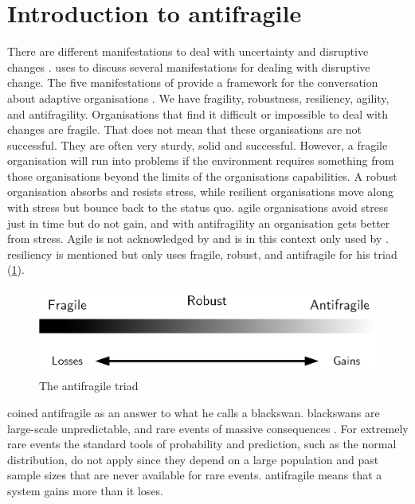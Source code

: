 \section{Introduction to antifragile}
\label{sec:introantifragility}
There are different manifestations to deal with uncertainty and disruptive changes \parencite[pp.~79--81]{Steen2018}. \Textcite{Steen2018} uses \textcite{Taleb2012} to discuss several manifestations for dealing with disruptive change. The five manifestations of \textcite{Taleb2012} provide a framework for the conversation about adaptive organisations \parencite[pp.~79--81]{Steen2018}. We have \gls{fragility}, \gls{robustness}, \gls{resiliency}, \gls{agility}, and \gls{antifragility}. Organisations that find it difficult or impossible to deal with changes are fragile. That does not mean that these organisations are not successful. They are often very sturdy, solid and successful. However, a fragile organisation will run into problems if the environment requires something from those organisations beyond the limits of the organisations capabilities. A \gls{robust} organisation absorbs and resists stress, while \gls{resilient} organisations move along with stress but bounce back to the status quo. \Gls{agile} organisations avoid stress just in time but do not gain, and with \gls{antifragility} an organisation gets better from stress. Agile is not acknowledged by \textcite{Taleb2012} and is in this context only used by \textcite{Steen2018}. \Gls{resiliency} is mentioned but \textcite{Taleb2012} only uses \gls{fragile}, \gls{robust}, and \gls{antifragile} for his \gls{triad} (\cref{fig:antifragilesimple}).
\begin{figure}[H]
	\centering
	\includegraphics[width=0.6\linewidth]{images/antifragilesimple}
	\caption[The antifragile triad]{The antifragile triad}
	\label{fig:antifragilesimple}
\end{figure}
\textcite{Taleb2012} coined \gls{antifragile} as an answer to what he calls a \gls{blackswan}. \Glspl{blackswan} are large-scale unpredictable, and rare events of massive consequences \parencite[p.~6]{Taleb2012}. For extremely rare events the standard tools of probability and prediction, such as the normal distribution, do not apply since they depend on a large population and past sample sizes that are never available for rare events. \Gls{antifragile} means that a system gains more than it loses. 

